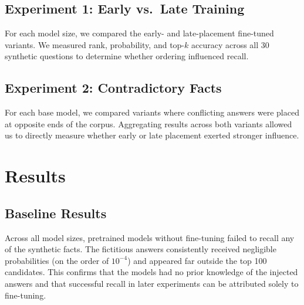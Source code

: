 \documentclass[11pt]{article}
\begin{document}
\subsection{Experiment 1: Early vs.\ Late Training}
For each model size, we compared the early- and late-placement fine-tuned variants. We measured rank, probability, and top-$k$ accuracy across all 30 synthetic questions to determine whether ordering influenced recall.

\subsection{Experiment 2: Contradictory Facts}
For each base model, we compared variants where conflicting answers were placed at opposite ends of the corpus. Aggregating results across both variants allowed us to directly measure whether early or late placement exerted stronger influence.

\section{Results}

\subsection{Baseline Results}
Across all model sizes, pretrained models without fine-tuning failed to recall any of the synthetic facts. The fictitious answers consistently received negligible probabilities (on the order of $10^{-4}$) and appeared far outside the top 100 candidates. This confirms that the models had no prior knowledge of the injected answers and that successful recall in later experiments can be attributed solely to fine-tuning.
\end{document}
